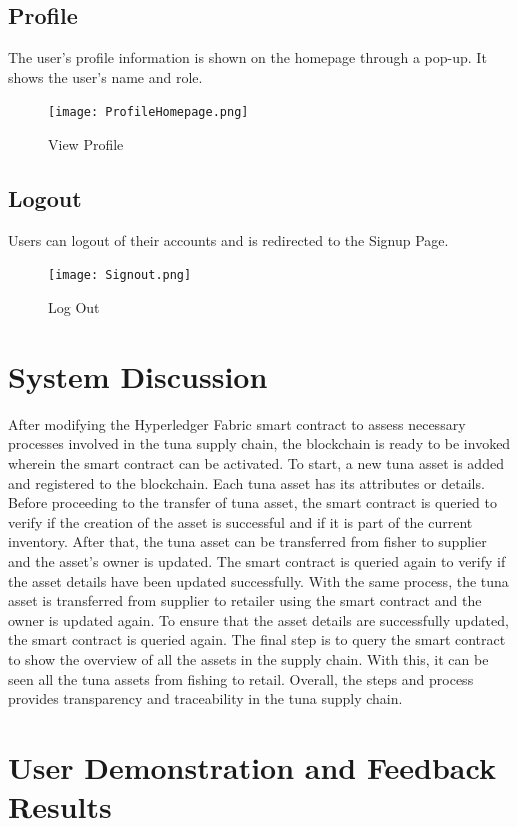 \subsection{Profile}
The user's profile information is shown on the homepage through a pop-up. It shows the user's name and role.

	\begin{figure}[H]
		\centering
		\texttt{[image: ProfileHomepage.png]}
		\caption{View Profile}
		\label{fig:view_profile}
	\end{figure}

\subsection{Logout}
Users can logout of their accounts and is redirected to the Signup Page.

	\begin{figure}[H]
		\centering
		\texttt{[image: Signout.png]}
		\caption{Log Out}
		\label{fig:signout}
	\end{figure} 
	
\section{System Discussion}
After modifying the Hyperledger Fabric smart contract to assess necessary processes involved in the tuna supply chain, the blockchain is ready to be invoked wherein the smart contract can be activated. To start, a new tuna asset is added and registered to the blockchain. Each tuna asset has its attributes or details. Before proceeding to the transfer of tuna asset, the smart contract is queried to verify if the creation of the asset is successful and if it is part of the current inventory. After that, the tuna asset can be transferred from fisher to supplier and the asset's owner is updated. The smart contract is queried again to verify if the asset details have been updated successfully. With the same process, the tuna asset is transferred from supplier to retailer using the smart contract and the owner is updated again. To ensure that the asset details are successfully updated, the smart contract is queried again. The final step is to query the smart contract to show the overview of all the assets in the supply chain. With this, it can be seen all the tuna assets from fishing to retail. Overall, the steps and process provides transparency and traceability in the tuna supply chain.

\section{User Demonstration and Feedback Results}
